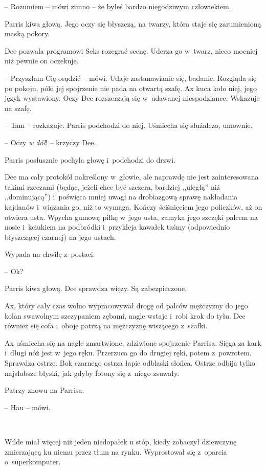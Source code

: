 \documentclass[oneside,polish,11pt,sfheadings]{mwbk}
\begin{document}
-- Rozumiem -- mówi zimno -- że byłeś bardzo niegodziwym człowiekiem.

Parris kiwa głową. Jego oczy się błyszczą, na twarzy, która staje się
zarumienioną maską pokory.

Dee pozwala programowi Seks rozegrać scenę. Uderza go w~twarz, nieco
mocniej niż pewnie on oczekuje.

-- Przyszłam Cię osądzić -- mówi. Udaje zastanawianie się, badanie.
Rozgląda się po pokoju, póki jej spojrzenie nie pada na otwartą szafę.
Ax kuca koło niej, jego język wystawiony. Oczy Dee rozszerzają się w~udawanej niespodziance. Wskazuje na szafę.

-- Tam -- rozkazuje. Parris podchodzi do niej. Uśmiecha się służalczo,
umownie.

-- Oczy \emph{w dół}! -- krzyczy Dee.

Parris posłusznie pochyla głowę i~podchodzi do drzwi.

Dee ma cały protokół nakreślony w~głowie, ale naprawdę nie jest
zainteresowana takimi rzeczami (będąc, jeżeli chce być szczera, bardziej
,,uległą'' niż ,,dominującą'') i~poświęca mniej uwagi na drobiazgową sprawę
nakładania kajdanów i~wiązania go, niż to wymaga. Kończy ściśnięciem
jego policzków, aż on otwiera usta. Wpycha gumową piłkę w~jego usta,
zamyka jego szczęki palcem na nosie i~kciukiem na podbródki i~przykleja
kawałek taśmy (odpowiednio błyszczącej czarnej) na jego ustach.

Wypada na chwilę z~postaci.

-- Ok?

Parris kiwa głową. Dee sprawdza więzy. Są zabezpieczone.

Ax, który cały czas wolno wypracowywał drogę od palców mężczyzny do jego
kolan swawolnym szczypaniem zębami, nagle wstaje i~robi krok do tyłu.
Dee również się cofa i~oboje patrzą na mężczyznę wiszącego z~szafki.

Ax uśmiecha się na nagle zmartwione, zdziwione spojrzenie Parrisa. Sięga
za kark i~długi nóż jest w~jego ręku. Przerzuca go do drugiej ręki,
potem z~powrotem. Sprawdza ostrze. Bok czarnego ostrza łapie odblaski
słońca. Ostrze odbija tylko najsłabsze błyski, jak gdyby fotony się z~niego zsuwały.

Patrzy znowu na Parrisa.

-- Hau -- mówi.

~

Wilde miał więcej niż jeden niedopałek u stóp, kiedy zobaczył dziewczynę
zmierzającą ku niemu przez tłum na rynku. Wyprostował się z~oparcia o~superkomputer.
\end{document}
